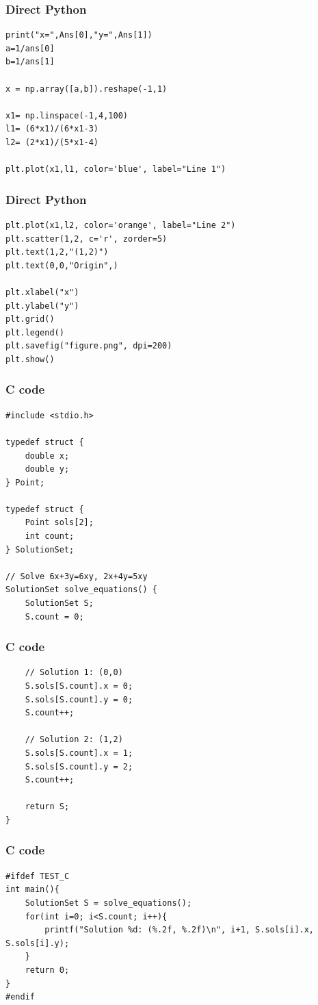\documentclass{beamer}
\begin{document}
\begin{frame}[fragile]
\frametitle{Direct Python}
\begin{lstlisting}
print("x=",Ans[0],"y=",Ans[1])
a=1/ans[0]
b=1/ans[1]

x = np.array([a,b]).reshape(-1,1)

x1= np.linspace(-1,4,100)
l1= (6*x1)/(6*x1-3)
l2= (2*x1)/(5*x1-4)

plt.plot(x1,l1, color='blue', label="Line 1")
\end{lstlisting}
\end{frame}
\begin{frame}[fragile]
\frametitle{Direct Python}
\begin{lstlisting}
plt.plot(x1,l2, color='orange', label="Line 2")
plt.scatter(1,2, c='r', zorder=5)
plt.text(1,2,"(1,2)")
plt.text(0,0,"Origin",)

plt.xlabel("x")
plt.ylabel("y")
plt.grid()
plt.legend()
plt.savefig("figure.png", dpi=200)
plt.show()
\end{lstlisting}
\end{frame}
\begin{frame}[fragile]
\frametitle{C code}
\begin{lstlisting}
#include <stdio.h>

typedef struct {
    double x;
    double y;
} Point;

typedef struct {
    Point sols[2];
    int count;
} SolutionSet;

// Solve 6x+3y=6xy, 2x+4y=5xy
SolutionSet solve_equations() {
    SolutionSet S;
    S.count = 0;
\end{lstlisting}
\end{frame}
\begin{frame}[fragile]
\frametitle{C code}
\begin{lstlisting}
    // Solution 1: (0,0)
    S.sols[S.count].x = 0;
    S.sols[S.count].y = 0;
    S.count++;

    // Solution 2: (1,2)
    S.sols[S.count].x = 1;
    S.sols[S.count].y = 2;
    S.count++;

    return S;
}
\end{lstlisting}
\end{frame}
\begin{frame}[fragile]
\frametitle{C code}
\begin{lstlisting}
#ifdef TEST_C
int main(){
    SolutionSet S = solve_equations();
    for(int i=0; i<S.count; i++){
        printf("Solution %d: (%.2f, %.2f)\n", i+1, S.sols[i].x, S.sols[i].y);
    }
    return 0;
}
#endif
\end{lstlisting}
\end{frame}
\end{document}
